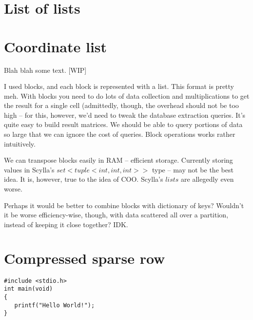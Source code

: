 \documentclass{article}
\begin{document}
\pagebreak
\section{List of lists}

\pagebreak
\section{Coordinate list}

Blah blah some text. [WIP]

I used blocks, and each block is represented with a list.
This format is pretty meh. With blocks you need to do lots of data collection and multiplications to get the result for a single cell (admittedly, though, the overhead should not be too high -- for this, however, we'd need to tweak the database extraction queries. It's quite easy to build result matrices. We should be able to query portions of data so large that we can ignore the cost of queries. Block operations works rather intuitively. 

We can transpose blocks easily in RAM -- efficient storage.
Currently storing values in Scylla's $set<tuple<int, int, int>>$ type -- may not be the best idea. It is, however, true to the idea of COO. Scylla's $lists$ are allegedly even worse.

Perhaps it would be better to combine blocks with dictionary of keys? Wouldn't it be worse efficiency-wise, though, with data scattered all over a partition, instead of keeping it close together? IDK.

\pagebreak
\section{Compressed sparse row}


\begin{lstlisting}[style=CStyle]
#include <stdio.h>
int main(void)
{
   printf("Hello World!"); 
}
\end{lstlisting}
\end{document}
